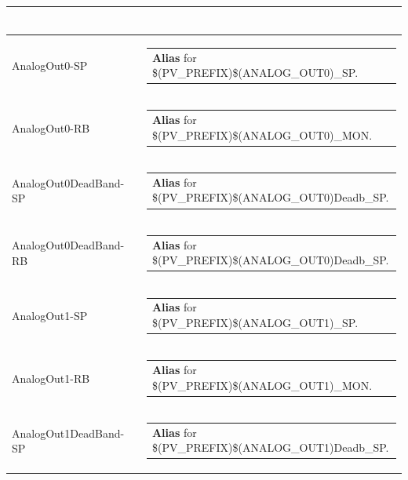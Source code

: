 \documentclass[openany]{article}
\begin{document}
\begin{longtable}{| m{4.5cm} m{2.5cm}  m{8.5cm} |}
\begin{tabular}{@{}m{6cm}@{}}
            \end{tabular} \hypertarget{pv:analog-out-0}{}\\ \hline
        AnalogOut0-SP &  & \begin{tabular}{@{}m{6cm}@{}}
                \textbf{\color{blue} Alias} for \$(PV\_PREFIX)\$(ANALOG\_OUT0)\_SP.
            \end{tabular} \hypertarget{}{}\\ \hline
        AnalogOut0-RB &  & \begin{tabular}{@{}m{6cm}@{}}
                \textbf{\color{blue} Alias} for \$(PV\_PREFIX)\$(ANALOG\_OUT0)\_MON.
            \end{tabular} \hypertarget{pv:analog-out-0-dead-band}{}\\ \hline
        AnalogOut0DeadBand-SP &  & \begin{tabular}{@{}m{6cm}@{}}
                \textbf{\color{blue} Alias} for \$(PV\_PREFIX)\$(ANALOG\_OUT0)Deadb\_SP.
            \end{tabular} \hypertarget{}{}\\ \hline
        AnalogOut0DeadBand-RB &  & \begin{tabular}{@{}m{6cm}@{}}
                \textbf{\color{blue} Alias} for \$(PV\_PREFIX)\$(ANALOG\_OUT0)Deadb\_SP.
            \end{tabular} \hypertarget{pv:analog-out-1}{}\\ \hline
        AnalogOut1-SP &  & \begin{tabular}{@{}m{6cm}@{}}
                \textbf{\color{blue} Alias} for \$(PV\_PREFIX)\$(ANALOG\_OUT1)\_SP.
            \end{tabular} \hypertarget{}{}\\ \hline
        AnalogOut1-RB &  & \begin{tabular}{@{}m{6cm}@{}}
                \textbf{\color{blue} Alias} for \$(PV\_PREFIX)\$(ANALOG\_OUT1)\_MON.
            \end{tabular} \hypertarget{pv:analog-out-1-dead-band}{}\\ \hline
        AnalogOut1DeadBand-SP &  & \begin{tabular}{@{}m{6cm}@{}}
                \textbf{\color{blue} Alias} for \$(PV\_PREFIX)\$(ANALOG\_OUT1)Deadb\_SP.
            \end{tabular} \hypertarget{}{}\\ \hline

\end{longtable}
\end{document}
